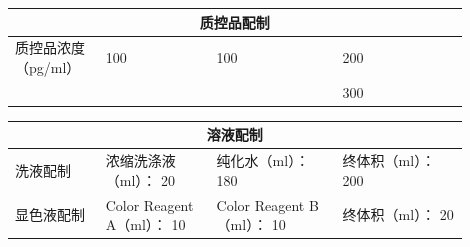 \documentclass[UTF8,10pt,a4paper,fontset=fandol]{ctexart}
\newcommand{\fieldvalue}[1]{#1}
\newcommand{\handwritten}[1]{#1}
\begin{document}
\begin{center}
\small
\begin{tabular}{|p{0.18\linewidth}|p{0.22\linewidth}|p{0.25\linewidth}|p{0.25\linewidth}|}
\hline
\multicolumn{4}{c}{质控品配制} \\
\hline
质控品浓度（pg/ml） &
\fieldvalue{\handwritten{100}} &
\fieldvalue{\handwritten{100}} &
\fieldvalue{\handwritten{200}} \\
\hline
 & \multicolumn{2}{c|}{} &
\fieldvalue{\handwritten{300}} \\
\hline
\end{tabular}
\end{center}

\begin{center}
\small
\begin{tabular}{|p{0.18\linewidth}|p{0.22\linewidth}|p{0.25\linewidth}|p{0.25\linewidth}|}
\hline
\multicolumn{4}{c}{溶液配制} \\
\hline
洗液配制 &
浓缩洗涤液（ml）：
\fieldvalue{\handwritten{20}} &
纯化水（ml）：
\fieldvalue{\handwritten{180}} &
终体积（ml）：
\fieldvalue{\handwritten{200}} \\
\hline
显色液配制 &
Color Reagent A（ml）：
\fieldvalue{\handwritten{10}} &
Color Reagent B（ml）：
\fieldvalue{\handwritten{10}} &
终体积（ml）：
\fieldvalue{\handwritten{20}} \\
\hline
\end{tabular}
\end{center}
\end{document}
